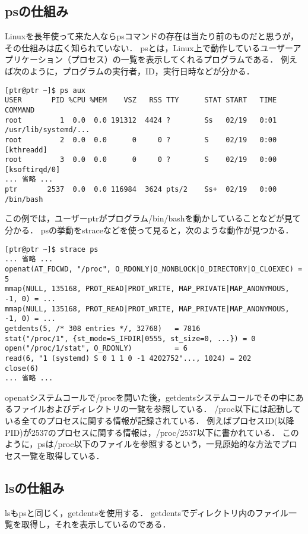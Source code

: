 \documentclass{jsarticle}
\begin{document}
  \subsection{psの仕組み}
  Linuxを長年使って来た人ならpsコマンドの存在は当たり前のものだと思うが，その仕組みは広く知られていない．
  psとは，Linux上で動作しているユーザーアプリケーション（プロセス）の一覧を表示してくれるプログラムである．
  例えば次のように，プログラムの実行者，ID，実行日時などが分かる．
  \\
  \begin{lstlisting}[basicstyle=\ttfamily\footnotesize, frame=single]
[ptr@ptr ~]$ ps aux 
USER       PID %CPU %MEM    VSZ   RSS TTY      STAT START   TIME COMMAND
root         1  0.0  0.0 191312  4424 ?        Ss   02/19   0:01 /usr/lib/systemd/...
root         2  0.0  0.0      0     0 ?        S    02/19   0:00 [kthreadd]
root         3  0.0  0.0      0     0 ?        S    02/19   0:00 [ksoftirqd/0]               
... 省略 ...
ptr       2537  0.0  0.0 116984  3624 pts/2    Ss+  02/19   0:00 /bin/bash
  \end{lstlisting}
  この例では，ユーザーptrがプログラム/bin/bashを動かしていることなどが見て分かる．
  psの挙動をstraceなどを使って見ると，次のような動作が見つかる．
  \\
  \begin{lstlisting}[basicstyle=\ttfamily\footnotesize, frame=single]
[ptr@ptr ~]$ strace ps
... 省略 ...
openat(AT_FDCWD, "/proc", O_RDONLY|O_NONBLOCK|O_DIRECTORY|O_CLOEXEC) = 5
mmap(NULL, 135168, PROT_READ|PROT_WRITE, MAP_PRIVATE|MAP_ANONYMOUS, -1, 0) = ...
mmap(NULL, 135168, PROT_READ|PROT_WRITE, MAP_PRIVATE|MAP_ANONYMOUS, -1, 0) = ...
getdents(5, /* 308 entries */, 32768)   = 7816
stat("/proc/1", {st_mode=S_IFDIR|0555, st_size=0, ...}) = 0
open("/proc/1/stat", O_RDONLY)          = 6
read(6, "1 (systemd) S 0 1 1 0 -1 4202752"..., 1024) = 202
close(6)
... 省略 ...
  \end{lstlisting}
  openatシステムコールで/procを開いた後，getdentsシステムコールでその中にあるファイルおよびディレクトリの一覧を参照している．
  /proc以下には起動している全てのプロセスに関する情報が記録されている．
  例えばプロセスID(以降PID)が2537のプロセスに関する情報は，/proc/2537以下に書かれている．
  このように，psは/proc以下のファイルを参照するという，一見原始的な方法でプロセス一覧を取得している．

  \subsection{lsの仕組み}
  lsもpsと同じく，getdentsを使用する．
  getdentsでディレクトリ内のファイル一覧を取得し，それを表示しているのである．
\end{document}
